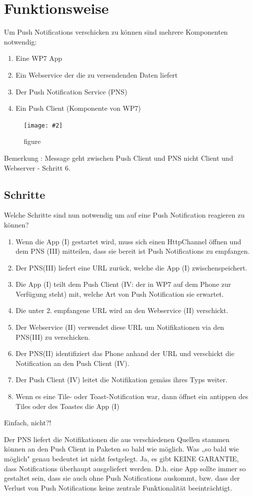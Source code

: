 \documentclass[a4paper,10pt]{scrreprt}
\newcommand{\pic}[2][figure]{\begin{figure}[h]
 \centering
 \texttt{[image: \#2]}
 \caption{#1}
\end{figure}
}
\begin{document}
\section{Funktionsweise}
Um Push Notifications verschicken zu können sind mehrere Komponenten notwendig:
\begin{enumerate}
\item Eine WP7 App
\item Ein Webservice der die zu versendenden Daten liefert
\item Der Push Notification Service (PNS)
\item Ein Push Client (Komponente von WP7)
\end{enumerate}

\pic{drawing.png}
Bemerkung : Message geht zwischen Push Client und PNS nicht Client und Webserver - Schritt 6.

\subsection{Schritte}
Welche Schritte sind nun notwendig um auf eine Push Notification reagieren zu können?
\begin{enumerate}


\item Wenn die App (I) gestartet wird, muss sich einen HttpChannel öffnen und dem PNS (III) mitteilen, dass
sie bereit ist Push Notifications zu empfangen.
\item Der PNS(III) liefert eine URL zurück, welche die App (I) zwischenspeichert.
\item Die App (I) teilt dem Push Client (IV: der in WP7 auf dem Phone zur Verfügung steht) mit, welche Art
von Push Notification sie erwartet.
\item Die unter 2. empfangene URL wird an den Webservice (II) verschickt.
\item Der Webservice (II) verwendet diese URL um Notifikationen via den PNS(III) zu verschicken.
\item Der PNS(II) identifiziert das Phone anhand der URL und verschickt die Notification an den Push Client
(IV).
\item Der Push Client (IV) leitet die Notifikation gemäss ihres Typs weiter.
\item Wenn es eine Tile- oder Toast-Notification war, dann öffnet ein antippen des Tiles oder des Toastes die
App (I)
\end{enumerate}
Einfach, nicht?!

Der PNS liefert die Notifikationen die aus verschiedenen Quellen stammen können an den Push Client in
Paketen so bald wie möglich. Was „so bald wie möglich" genau bedeutet ist nicht festgelegt. Ja, es gibt KEINE
GARANTIE, dass Notifications überhaupt ausgeliefert werden. D.h. eine App sollte immer so gestaltet sein, dass
sie auch ohne Push Notifications auskommt, bzw. dass der Verlust von Push Notifications keine zentrale
Funktionalität beeinträchtigt.
\end{document}

